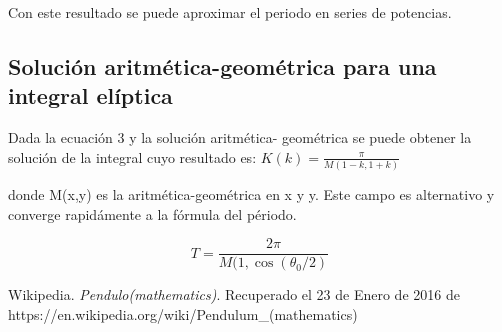 \documentclass[12pt]{article}
\begin{document}
Con este resultado se puede aproximar el periodo en series de potencias.



\subsection{Solución aritmética-geométrica para una integral elíptica}

Dada la ecuación 3 y la solución aritmética- geométrica se puede obtener la solución de la integral cuyo resultado es:
$ K(k)=\frac{\pi}{M(1-k,1+k)} $

donde M(x,y) es la aritmética-geométrica en x y y. Este campo es alternativo y converge rapidámente a la fórmula del périodo.

\begin{equation}
T=\frac{2\pi}{M(1,\cos(\theta_{0}/2)} 
\end{equation}






\begin{thebibliography}{6}


Wikipedia.
\emph{Pendulo(mathematics)}.
Recuperado el 23 de Enero de 2016 de https://en.wikipedia.org/wiki/Pendulum\_(mathematics)
\end{thebibliography}
\end{document}
